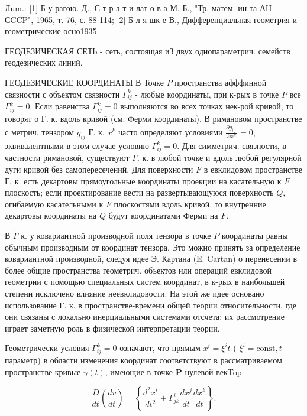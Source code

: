\documentclass[10pt]{article}
\begin{document}
Лum.: [1] Б у рагою. Д., С т р а т и лат о в а М. Б., "Тр. матем. ин-та АН СCCP", 1965, т. 76, с. 88-114; [2] Б л я шк е В., Дифференциальная геометрия и геометрические осно1935.



ГЕОДЕЗИЧЕСКАЯ СЕТЬ - сеть, состоящая иЗ двух однопараметрич. семейств геодезических линий.



ГЕОДЕЗИЧЕСКИЕ КООРДИНАТЫ В Точке $P$ пространства афффинной связности с объектом связности $\Gamma_{i j}^{k}$ - любые координаты, при к-рых в точке $P$ все $\Gamma_{i j}^{k}=0$. Если равенства $\Gamma_{i j}^{k}=0$ выполняются во всех точках нек-рой кривой, то говорят о Г. к. вдоль кривой (см. Ферми координаты). В римановом пространстве с метрич. тензором $g_{i j}$ Г. к. $x^{k}$ часто определяют условиями $\frac{\partial g_{i \jmath}}{\partial x^{k}}=0$, эквивалентными в этом случае условию $\Gamma_{i j}^{k}=0$. Для симметрич. связности, в частности римановой, существуют $\Gamma$. к. в любой точке и вдоль любой регулярной дуги кривой без самопересечений. Для поверхности $F$ в евклидовом пространстве $Г$. к. есть декартовы прямоугольные координаты проекции на касательную к $F$ плоскость; если проектирование вести на развертывающуюся поверхность $Q$, огибаемую касательными к $F$ плоскостями вдоль кривой, то внутренние декартовы координаты на $Q$ будут координатами Ферми на $F$.



В $\dot{\Gamma}$ к. у ковариантной производной поля тензора в точке $P$ координаты равны обычным производным от координат тензора. Это можно принять за определение ковариантной производной, следуя идее Э. Картана (E. Cartan) о перенесении в более общие пространства геометрич. объектов или операций евклидовой геометрии с помощью специальных систем координат, в к-рых в наибольшей степени исключено влияние неевклидовости. На этой же идее основано использование Г. к. в пространстве-времени общей теории относительности, где они связаны с локально инерциальными системами отсчета; их рассмотрение играет заметную роль в физической интерпретации теории.



Геометрически условия $\Gamma_{i j}^{k}=0$ означают, что прямым $x^{i}=\xi^{i} t$ ( $\xi^{i}=\mathrm{const}, t-$ параметр) в области изменения координат соответствуют в рассматриваемом пространстве кривые $\gamma(t)$, имеющие в точке $\boldsymbol{P}$ нулевой векTop



\[

\frac{D}{d t}\left(\frac{d v}{d t}\right)=\left\{\frac{d^{2} x^{i}}{d t^{2}}+\Gamma_{j k}^{i} \frac{d x^{j}}{d t} \frac{d x^{k}}{d t}\right\} .

\]
\end{document}
